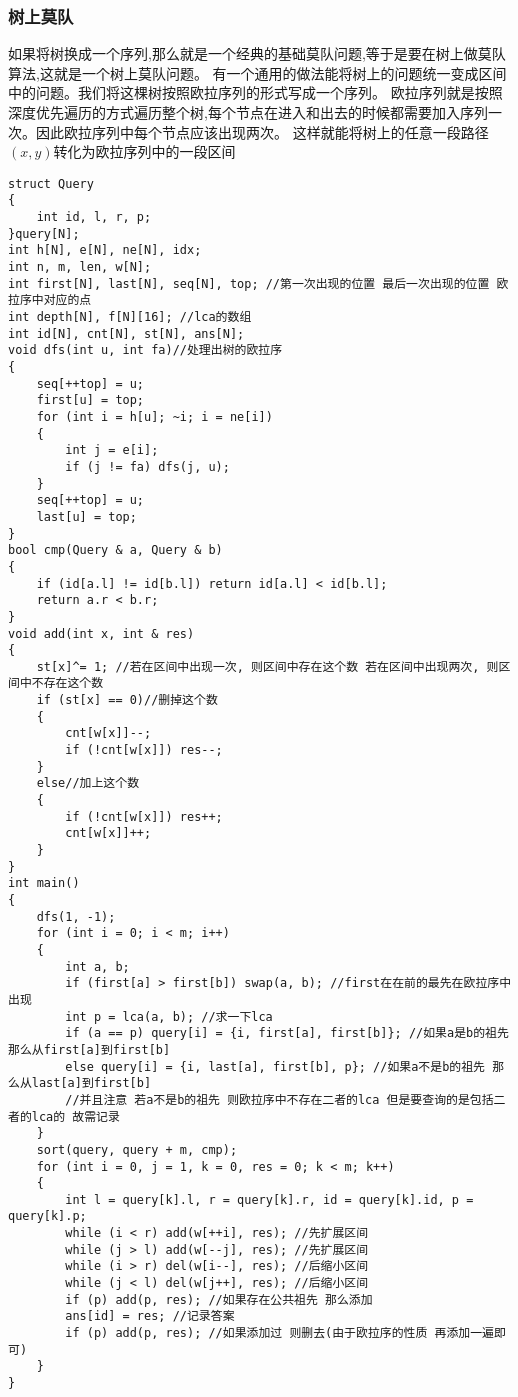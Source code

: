 \documentclass[a4paper,fontset=none]{ctexart}
\begin{document}
\subsubsection{树上莫队}
如果将树换成一个序列,那么就是一个经典的基础莫队问题,等于是要在树上做莫队算法,这就是一个树上莫队问题。
有一个通用的做法能将树上的问题统一变成区间中的问题。我们将这棵树按照欧拉序列的形式写成一个序列。
欧拉序列就是按照深度优先遍历的方式遍历整个树,每个节点在进入和出去的时候都需要加入序列一次。因此欧拉序列中每个节点应该出现两次。
这样就能将树上的任意一段路径$(x,y)$转化为欧拉序列中的一段区间
\begin{verbatim}
struct Query
{
    int id, l, r, p;
}query[N];
int h[N], e[N], ne[N], idx;
int n, m, len, w[N];
int first[N], last[N], seq[N], top; //第一次出现的位置 最后一次出现的位置 欧拉序中对应的点
int depth[N], f[N][16]; //lca的数组
int id[N], cnt[N], st[N], ans[N];
void dfs(int u, int fa)//处理出树的欧拉序
{
    seq[++top] = u;
    first[u] = top;
    for (int i = h[u]; ~i; i = ne[i])
    {
        int j = e[i];
        if (j != fa) dfs(j, u);
    }
    seq[++top] = u;
    last[u] = top;
}
bool cmp(Query & a, Query & b)
{
    if (id[a.l] != id[b.l]) return id[a.l] < id[b.l];
    return a.r < b.r;
}
void add(int x, int & res)
{
    st[x]^= 1; //若在区间中出现一次, 则区间中存在这个数 若在区间中出现两次, 则区间中不存在这个数
    if (st[x] == 0)//删掉这个数
    {
        cnt[w[x]]--;
        if (!cnt[w[x]]) res--;
    }
    else//加上这个数
    {
        if (!cnt[w[x]]) res++;
        cnt[w[x]]++;
    }
}
int main()
{
    dfs(1, -1);
    for (int i = 0; i < m; i++)
    {
        int a, b;
        if (first[a] > first[b]) swap(a, b); //first在在前的最先在欧拉序中出现
        int p = lca(a, b); //求一下lca
        if (a == p) query[i] = {i, first[a], first[b]}; //如果a是b的祖先 那么从first[a]到first[b]
        else query[i] = {i, last[a], first[b], p}; //如果a不是b的祖先 那么从last[a]到first[b]
        //并且注意 若a不是b的祖先 则欧拉序中不存在二者的lca 但是要查询的是包括二者的lca的 故需记录
    }
    sort(query, query + m, cmp);
    for (int i = 0, j = 1, k = 0, res = 0; k < m; k++)
    {
        int l = query[k].l, r = query[k].r, id = query[k].id, p = query[k].p;
        while (i < r) add(w[++i], res); //先扩展区间
        while (j > l) add(w[--j], res); //先扩展区间
        while (i > r) del(w[i--], res); //后缩小区间
        while (j < l) del(w[j++], res); //后缩小区间
        if (p) add(p, res); //如果存在公共祖先 那么添加
        ans[id] = res; //记录答案
        if (p) add(p, res); //如果添加过 则删去(由于欧拉序的性质 再添加一遍即可)
    }
}
\end{verbatim}
\end{document}

